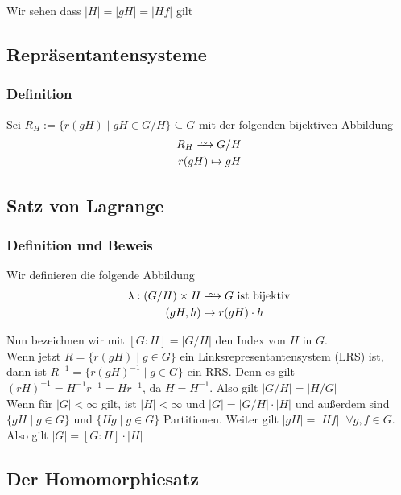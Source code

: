 \documentclass[12pt, german]{article}
\newcommand\iso{\xrightarrow{
		\,\smash{\raisebox{-0.65ex}{\ensuremath{\scriptstyle\sim}}}\,}}
\begin{document}
Wir sehen dass $|H|=|gH| = |Hf|$ gilt

\subsection{Repräsentantensysteme}		
\subsubsection{Definition}
	Sei $R_H := \{r(gH) \mid gH \in G/H\} \subseteq G$ mit der folgenden bijektiven  Abbildung
	\begin{align*}
		R_H \iso G/H \\
		r(gH) \mapsto gH 
	\end{align*}

\subsection{Satz von Lagrange}		
\subsubsection{Definition und Beweis}
	Wir definieren die folgende Abbildung
	\begin{align*}
		\lambda: (G/H) \times H &\iso G \text{ ist bijektiv} \\
		(gH, h) &\mapsto r(gH) \cdot h
	\end{align*}
	 
	Nun bezeichnen wir mit $[G:H] = |G/H|$ den Index von $H$ in $G$. \\ 
	Wenn jetzt $R = \{r(gH) \mid g \in G \}$ ein Linksrepresentantensystem (LRS) ist, \\ 
	dann ist $R^{-1} = \{r(gH)^{-1} \mid g \in G \}$ ein RRS. 
	Denn es gilt $(rH)^{-1} = H^{-1}r^{-1} = Hr^{-1}$, da $H=H^{-1}$.
	Also gilt $|G/H| = |H/G|$ \\
	
	Wenn für $|G| < \infty $ gilt, ist $|H| < \infty $ und $|G| = |G/H| \cdot |H|$ und 
	außerdem sind $\{gH \mid g \in G \}$ und $\{Hg \mid g \in G \}$ Partitionen. Weiter gilt $|gH| = |Hf| \;\;\forall g,f \in G$. \\
	Also gilt $|G| = [G:H] \cdot |H|$ 


\subsection{Der Homomorphiesatz}		
\end{document}
